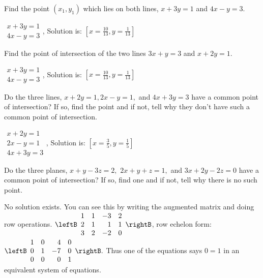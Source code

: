 \begin{enumialphparenastyle}

\begin{ex}
Find the point $\left( x_{1},y_{1}\right) $ which
lies on both lines, $x+3y=1$ and $4x-y=3.$
\begin{sol}
$\begin{array}{c}
x+3y=1 \\
4x-y=3
\end{array}
$, Solution is: $\left[ x=\frac{10}{13},y=\frac{1}{13}\right] $
\end{sol}
\end{ex}

\begin{ex}
Find the point of intersection of the two lines $
3x+y=3$ and $x+2y=1.$ 
\begin{sol}
$\begin{array}{c}
x+3y=1 \\
4x-y=3
\end{array}
$, Solution is: $\left[ x=\frac{10}{13},y=\frac{1}{13}\right] $
\end{sol}
\end{ex}


\begin{ex}
Do the three lines, $x+2y=1,2x-y=1,$ and $4x+3y=3$ have a common point
of intersection? If so, find the point and if not, tell why they don't have
such a common point of intersection. 
\begin{sol}
$\begin{array}{c}
x+2y=1 \\
2x-y=1 \\
4x+3y=3
\end{array}
$, Solution is: $\left[ x=\frac{3}{5},y=\frac{1}{5}\right] $
\end{sol}
\end{ex}

\begin{ex}
Do the three planes, $x+y-3z=2,$ $2x+y+z=1,$ and $3x+2y-2z=0$ have a
common point of intersection? If so, find one and if not, tell why there is
no such point. 
\begin{sol}
No solution exists. You can see this by writing the augmented
matrix and doing row operations. $\leftB
\begin{array}{rrrr}
1 & 1 & -3 & 2 \\
2 & 1 & 1 & 1 \\
3 & 2 & -2 & 0
\end{array}
\rightB $, row echelon form: $\leftB
\begin{array}{rrrr}
1 & 0 & 4 & 0 \\
0 & 1 & -7 & 0 \\
0 & 0 & 0 & 1
\end{array}
\rightB .$ Thus one of the equations says $0=1$ in an equivalent system of
equations.
\end{sol}
\end{ex}



\end{enumialphparenastyle}
